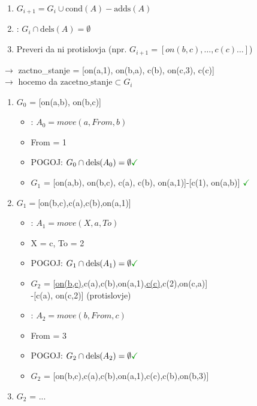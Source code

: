\begin{enumerate}[noitemsep,topsep=0pt,leftmargin=*]
\item $G_{i+1} = G_i \cup \text{cond}(A) - \text{adds}(A)$
\item {}: $G_{i} \cap \text{dels}(A) = \emptyset$
\item Preveri da ni protislovja (npr. $G_{i+1} = \left[on(b,c), \dots, c(c) \dots\right]$)
\end{enumerate}
$\rightarrow$ zactno\_stanje = [on(a,1), on(b,a), c(b), on(c,3), c(c)]\\
$\rightarrow$ hocemo da $\text{zacetno\_stanje} \subset G_i$
\begin{enumerate}[noitemsep,topsep=0pt,leftmargin=*,]
    \item $G_0$ = [on(a,b), on(b,c)]
    \begin{itemize}[noitemsep,topsep=0pt,leftmargin=0.5cm]
        \item {}: $A_0=move(a, From, b)$
        \item From = 1
        \item POGOJ: $G_0 \cap \text{dels}(A_0) = \emptyset \green{\checkmark}$
        \item $G_1$ = [on(a,b), on(b,c), c(a), c(b), on(a,1)]-[c(1), on(a,b)] $\green{\checkmark}$
    \end{itemize}
    \item $G_1=$[on(b,c),c(a),c(b),on(a,1)]
    \begin{itemize}[noitemsep,topsep=0pt,leftmargin=0.5cm]
        \item {}: $A_1=move(X, a, To)$
        \item X = c, To = 2
        \item POGOJ: $G_1 \cap \text{dels}(A_1) = \emptyset \green{\checkmark}$
        \item $G_2$ = [\underline{on(b,c)},c(a),c(b),on(a,1),\underline{c(c)},c(2),on(c,a)]\\ -[c(a), on(c,2)] \xmark (protislovje)
        \item {}: $A_2=move(b, From, c)$
        \item From = 3
        \item POGOJ: $G_2 \cap \text{dels}(A_2) = \emptyset \green{\checkmark}$
        \item $G_2$ = [on(b,c),c(a),c(b),on(a,1),c(c),c(b),on(b,3)] \cmark
    \end{itemize}
    \item $G_2$ = ...     
\end{enumerate}


